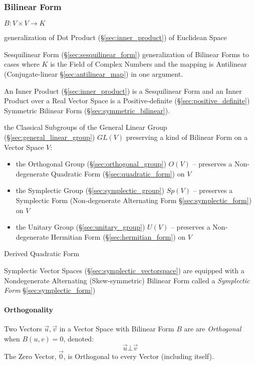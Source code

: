 {{\subsubsection{Bilinear Form}\label{sec:bilinear_form}

$B : V \times V \rightarrow K$

generalization of Dot Product (\S\ref{sec:inner_product}) of Euclidean Space

Sesquilinear Form (\S\ref{sec:sesquilinear_form}) generalization of Bilinear
Forms to cases where $K$ is the Field of Complex Numbers and the mapping is
Antilinear (Conjugate-linear \S\ref{sec:antilinear_map}) in one argument.

An Inner Product (\S\ref{sec:inner_product}) is a Sesquilinear Form and an
Inner Product over a Real Vector Space is a Positive-definite
(\S\ref{sec:positive_definite}) Symmetric Bilinear Form
(\S\ref{sec:symmetric_bilinear}).

the Classical Subgroups of the General Linear Group
(\S\ref{sec:general_linear_group}) $GL(V)$ preserving a kind of Bilinear Form
on a Vector Space $V$:
\begin{itemize}
  \item the Orthogonal Group (\S\ref{sec:orthogonal_group}) $O(V)$ -- preserves
    a Non-degenerate Quadratic Form (\S\ref{sec:quadratic_form}) on $V$
  \item the Symplectic Group (\S\ref{sec:symplectic_group}) $Sp(V)$
    -- preserves a Symplectic Form (Non-degenerate Alternating Form
    \S\ref{sec:symplectic_form}) on $V$
  \item the Unitary Group (\S\ref{sec:unitary_group}) $U(V)$
    -- preserves a Non-degenerate Hermitian Form (\S\ref{sec:hermitian_form})
    on $V$
\end{itemize}

Derived Quadratic Form

Symplectic Vector Spaces (\S\ref{sec:symplectic_vectorspace}) are equipped with
a Nondegenerate Alternating (Skew-symmetric) Bilinear Form called a
\emph{Symplectic Form} \S\ref{sec:symplectic_form})



\paragraph{Orthogonality}\label{sec:orthogonality}\hfill

Two Vectors $\vec{u}, \vec{v}$ in a Vector Space with Bilinear Form $B$
are are \emph{Orthogonal} when $B(u,v) = 0$, denoted:
\[
  \vec{u} \bot \vec{v}
\]
The Zero Vector, $\vec{0}$, is Orthogonal to every Vector (including itself).

}}
